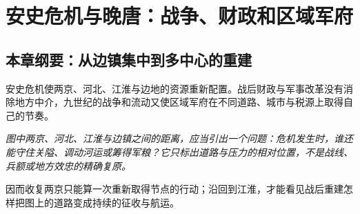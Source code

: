 \chapter{安史危机与晚唐：战争、财政和区域军府}
\label{ch:an-lushan-late-tang}
\section{本章纲要：从边镇集中到多中心的重建}
安史危机使两京、河北、江淮与边地的资源重新配置。战后财政与军事改革没有消除地方中介，九世纪的战争和流动又使区域军府在不同道路、城市与税源上取得自己的节奏。



\noindent\textit{图中两京、河北、江淮与边镇之间的距离，应当引出一个问题：危机发生时，谁还能守住关隘、调动河运或筹得军粮？它只标出道路与压力的相对位置，不是战线、兵额或地方效忠的精确复原。}

\noindent 因而收复两京只能算一次重新取得节点的行动；沿回到江淮，才能看见战后重建怎样把图上的道路变成持续的征收与航运。

